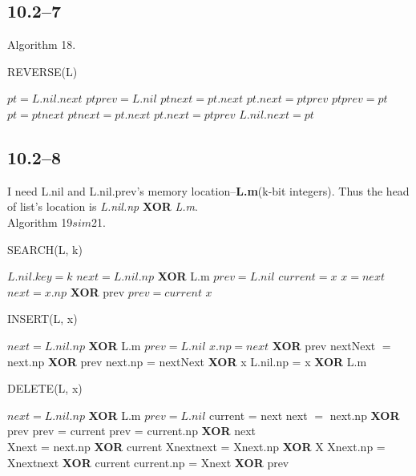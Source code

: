 \documentclass{article}
\begin{document}
\subsection{10.2--7}
Algorithm 18.
\begin{algorithm}
  \caption{REVERSE(L)}
  \begin{algorithmic}[1]
    \STATE $pt = L.nil.next$
    \STATE $ptprev = L.nil$
    \STATE $ptnext = pt.next$
    \STATE $pt.next = ptprev$
    \STATE $ptprev = pt$
    \STATE $pt = ptnext$
    \STATE $ptnext = pt.next$
    \ENDWHILE
    \STATE $pt.next = ptprev$
    \STATE $L.nil.next = pt$
  \end{algorithmic}
\end{algorithm}

\subsection*{10.2--8}
I need L.nil and L.nil.prev's memory location--\textbf{L.m}(k-bit integers). Thus the head of list's location is \textit{L.nil.np} \textbf{XOR} \textit{L.m}.\\
Algorithm 19$sim$21.
\begin{algorithm}
  \caption{SEARCH(L, k)}
  \begin{algorithmic}[1]
    \STATE $L.nil.key = k$
    \STATE $next = L.nil.np$ \textbf{XOR} L.m 
    \STATE $prev = L.nil$
    \STATE $current = x$
    \STATE $x = next$
    \STATE $next = x.np$ \textbf{XOR} prev
    \STATE $prev = current$
    \ENDWHILE
    \RETURN $x$
  \end{algorithmic}
\end{algorithm}

\begin{algorithm}
  \caption{INSERT(L, x)}
  \begin{algorithmic}[1]
    \STATE $next = L.nil.np$ \textbf{XOR} L.m 
    \STATE $prev = L.nil$
    \STATE $x.np = next$ \textbf{XOR} prev
    \STATE nextNext $=$ next.np \textbf{XOR} prev
    \STATE next.np = nextNext \textbf{XOR} x
    \STATE L.nil.np = x \textbf{XOR} L.m
  \end{algorithmic}
\end{algorithm}

\begin{algorithm}
  \caption{DELETE(L, x)}
  \begin{algorithmic}[1]
    \STATE $next = L.nil.np$ \textbf{XOR} L.m 
    \STATE $prev = L.nil$
    \STATE current = next
    \STATE next $=$ next.np \textbf{XOR} prev
    \STATE prev = current
    \ENDWHILE
    \STATE prev = current.np \textbf{XOR} next\\
    \STATE Xnext = next.np \textbf{XOR} current
    \STATE Xnextnext = Xnext.np \textbf{XOR} X
    \STATE Xnext.np = Xnextnext \textbf{XOR} current
    \STATE current.np = Xnext \textbf{XOR} prev
  \end{algorithmic}
\end{algorithm}
\end{document}
